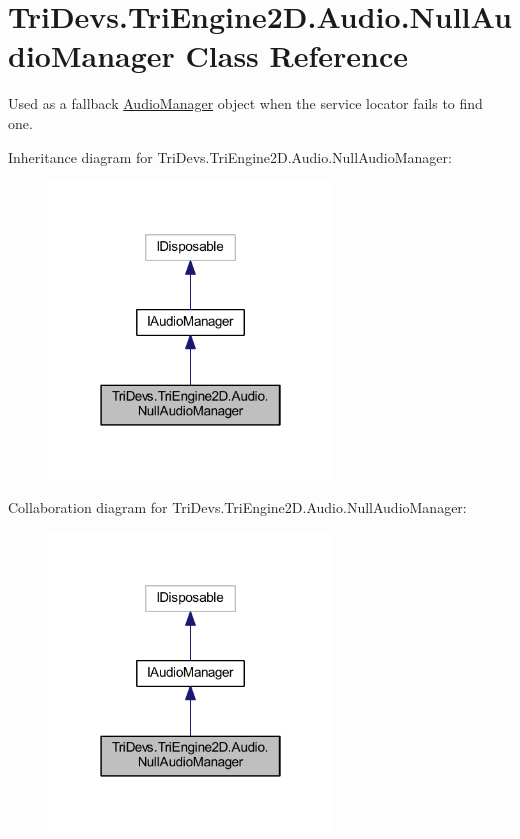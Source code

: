 \hypertarget{class_tri_devs_1_1_tri_engine2_d_1_1_audio_1_1_null_audio_manager}{\section{Tri\-Devs.\-Tri\-Engine2\-D.\-Audio.\-Null\-Audio\-Manager Class Reference}
\label{class_tri_devs_1_1_tri_engine2_d_1_1_audio_1_1_null_audio_manager}
}


Used as a fallback \hyperlink{class_tri_devs_1_1_tri_engine2_d_1_1_audio_1_1_audio_manager}{Audio\-Manager} object when the service locator fails to find one.  




Inheritance diagram for Tri\-Devs.\-Tri\-Engine2\-D.\-Audio.\-Null\-Audio\-Manager\-:\nopagebreak
\begin{figure}[H]
\begin{center}
\leavevmode
\includegraphics[width=214pt]{class_tri_devs_1_1_tri_engine2_d_1_1_audio_1_1_null_audio_manager__inherit__graph}
\end{center}
\end{figure}


Collaboration diagram for Tri\-Devs.\-Tri\-Engine2\-D.\-Audio.\-Null\-Audio\-Manager\-:\nopagebreak
\begin{figure}[H]
\begin{center}
\leavevmode
\includegraphics[width=214pt]{class_tri_devs_1_1_tri_engine2_d_1_1_audio_1_1_null_audio_manager__coll__graph}
\end{center}
\end{figure}
